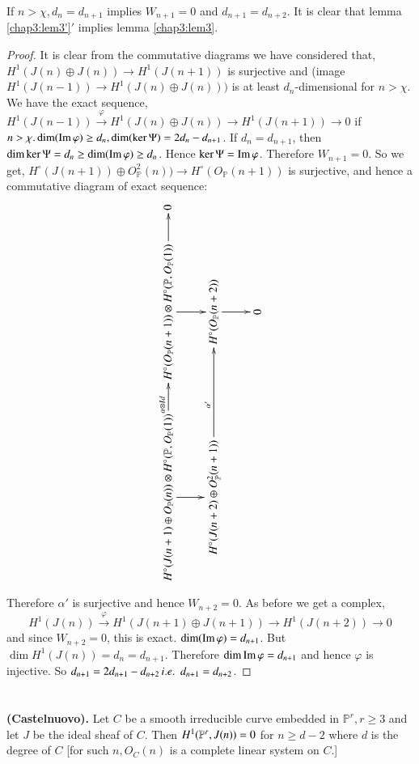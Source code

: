 \setcounter{dashlem}{2}
\begin{dashlem}\label{chap3:lem3'}
If $n>\chi,d_n=d_{n+1}$ implies $W_{n+1}=0$ and $d_{n+1}=d_{n+2}$. It
is clear that lemma \ref{chap3:lem3'}$'$ implies lemma \ref{chap3:lem3}.
\end{dashlem}

\begin{proof}
It is clear from the commutative diagrams we have considered that,
$H^1(J(n)\oplus J(n))\longrightarrow H^1(J(n+1))$ is surjective and
(image $H^1(J(n-1))\longrightarrow H^1(J(n)\oplus J(n)))$ is at least
$d_n$-dimensional for $n>\chi$. We have the exact sequence,
$H^1(J(n-1))\xrightarrow{\varphi}H^1(J(n)\oplus J(n)) \longrightarrow
H^1(J(n+1))\longrightarrow 0$ if\pageoriginale $n>\chi. \dim(\operatorname{Im}
\varphi)\geq d_n, \dim (\ker\Psi)=2d_n-d_{n+1}$. If $d_n=d_{n+1}$,
then $\dim \ker\Psi=d_n\geq\dim(\operatorname{Im}\varphi)\geq d_n$. Hence $\ker\Psi
= \operatorname{Im}\varphi$. Therefore $W_{n+1}=0$. So we get,
$H^\circ(J(n+1))\oplus O_{\mathbb{P}}^2(n))\longrightarrow H^\circ
(O_{\mathbb{P}}(n+1))$ is surjective, and hence a commutative diagram
of exact sequence:
\[
\rotatebox{90}{
\xymatrix{
H^\circ(J(n+1)\oplus O_{\mathbb{P}}(n))\otimes H^\circ (\mathbb{P},
O_{\mathbb{P}} (1)) \ar[d] \ar[r]^{\alpha\otimes Id} & H^\circ
(O_{\mathbb{P}}(n+1))\otimes H^\circ(\mathbb{P}, O_{\mathbb{P}}(1))
\ar[r] \ar[d] & 0\\
H^\circ(J(n+2)\oplus O_{\mathbb{P}}^2(n+1)) \ar[r]^{\alpha'} & H^\circ
(O_{\mathbb{P}}(n+2)) \ar[d]&\\
& 0 & 
}}
\]
Therefore $\alpha'$ is surjective and hence $W_{n+2}=0$. As before we
get a complex, 
$$
H^1(J(n))\xrightarrow{\varphi}H^1(J(n+1)\oplus J(n+1))\longrightarrow
H^1(J(n+2))\longrightarrow 0
$$
and since $W_{n+2}=0$, this is exact. $\dim(\operatorname{Im}\varphi)=d_{n+1}$. But
$\dim H^1(J(n))=d_n=d_{n+1}$. Therefore $\dim \operatorname{Im}\varphi=d_{n+1}$ and
hence $\varphi$ is injective. So $d_{n+1}=2d_{n+1}-d_{n+2} \,{i.e.}\kern.3em\,
d_{n+1}= d_{n+2}$.
\end{proof}

\section{}\label{chap3:sec3}
\begin{THM}\label{chap3:thm2}
{\bf (Castelnuovo).} Let $C$ be a smooth irreducible curve embedded in
$\mathbb{P}^r, r\geq 3$ and let $J$ be the ideal sheaf of $C$. Then
$H^1(\mathbb{P}^r,\break J(n))=0$ for $n\geq d-2$ where $d$ is the degree of
$C$ [\ie for such $n,O_C(n)$ is a complete linear system on $C$.]
\end{THM}

